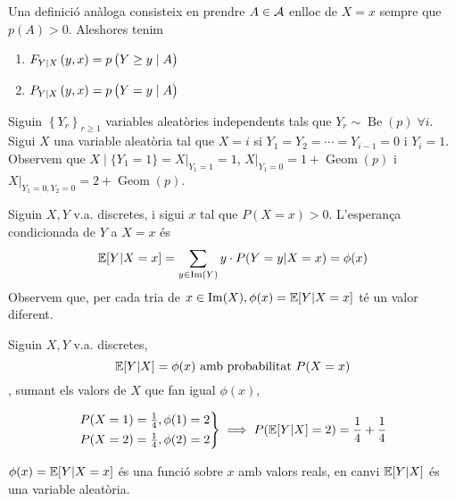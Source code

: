 \begin{obs}
 Una definició anàloga consisteix en prendre $A\in\mathcal{A}$ enlloc de $X=x$ sempre que $p(A)>0$. Aleshores tenim
    \begin{enumerate}[1)]
        \item $F_{Y\vert X} \left( y,x\right)=p\left( Y\geq y\mid A \right)$
        \item $P_{Y\vert X} \left( y,x\right)=p\left( Y = y\mid A \right)$
    \end{enumerate} 
\end{obs}

\begin{example}
    Siguin $\left\{Y_r\right\}_{r\geq 1}$ variables aleatòries independents tals que $Y_r \sim \operatorname{Be}(p)\; \forall i$. Sigui $X$ una 
    variable aleatòria tal que $X=i$ si $Y_1 = Y_2 = \cdots = Y_{i-1}=0$ i $Y_i=1$. Observem que $X\mid\{Y_1=1\}= X\vert_{Y_1=1}=1$, 
    $X\vert_{Y_1=0}=1+\operatorname{Geom}(p)$ i $X\vert_{Y_1=0,Y_2=0}=2+\operatorname{Geom}(p)$.
\end{example}

\begin{defi}
    Siguin $X,Y$ v.a. discretes, i sigui $x$ tal que $P(X=x)>0$. L'esperança condicionada de $Y$ a $X=x$ és
    \[\operatorname{\mathbb{E}}[Y \vert X=x] = \sum_{y \in \operatorname{Im}(Y)} y \cdot P(Y=y \vert X=x) = \phi(x)\]
    Observem que, per cada tria de $x\in\operatorname{Im}(X), \phi(x) = \operatorname{\mathbb{E}}[Y \vert X=x]$ té un valor diferent.
\end{defi}

\begin{defi}
    Siguin $X,Y$ v.a. discretes,
    \[\operatorname{\mathbb{E}}[Y \vert X] = \phi(x) \text{ amb probabilitat } P(X=x)\],
    sumant els valors de $X$ que fan igual $\phi(x)$,
\end{defi}

\begin{example}
    \[\begin{rcases}
    P(X=1) = \frac{1}{4}, \phi(1)=2\\
    P(X=2) = \frac{1}{4}, \phi(2)=2
    \end{rcases} \implies P(\operatorname{\mathbb{E}}[Y \vert X]=2)=\frac{1}{4}+\frac{1}{4}\]
\end{example}

\begin{obs}
    $\phi(x) = \operatorname{\mathbb{E}}[Y \vert X=x]$ és una funció sobre $x$ amb valors reals, en canvi $\operatorname{\mathbb{E}}[Y \vert X]$ és una variable aleatòria.
\end{obs}

